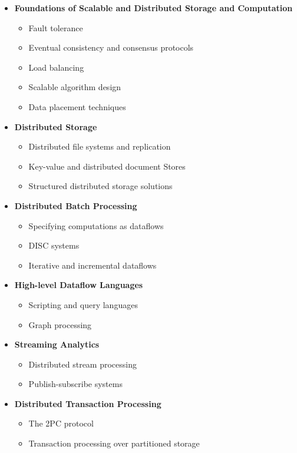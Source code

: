 \documentclass[12pt]{article}
\begin{document}
\begin{itemize}
\item \textbf{Foundations of Scalable and Distributed Storage and Computation}
  \begin{itemize}
  \item Fault tolerance
  \item Eventual consistency and consensus protocols
  \item Load balancing
  \item Scalable algorithm design
  \item Data placement techniques
  \end{itemize}
\item \textbf{Distributed Storage}
  \begin{itemize}
  \item Distributed file systems and replication
  \item Key-value and distributed document Stores
  \item Structured distributed storage solutions
  \end{itemize}
\item \textbf{Distributed Batch Processing}
  \begin{itemize}
  \item Specifying computations as dataflows
  \item DISC systems
  \item Iterative and incremental dataflows
  \end{itemize}
\item \textbf{High-level Dataflow Languages}
\begin{itemize}
\item Scripting and query languages
\item Graph processing
\end{itemize}
\item \textbf{Streaming Analytics}
  \begin{itemize}
  \item Distributed stream processing
  \item Publish-subscribe systems
  \end{itemize}
\item \textbf{Distributed Transaction Processing}
  \begin{itemize}
  \item The 2PC protocol
  \item Transaction processing over partitioned storage
  \end{itemize}
\end{itemize}
\end{document}
